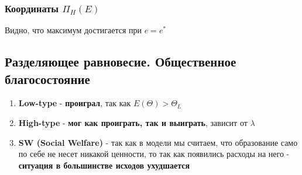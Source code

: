 \subsubsection{Координаты $\Pi_H(E)$}
\begin{center}
    \end{center}
\smallskip\indent\setlength{\parindent}{1em}Видно, что максимум достигается при $e=e^*$
\newpage
\subsection{Разделяющее равновесие. Общественное благосостояние}
\begin{enumerate}
    \item \textbf{Low-type} - \textbf{проиграл}, так как $E(\Theta)>\Theta_L$
    \item \textbf{High-type} - \textbf{мог как проиграть, так и выиграть}, зависит от $\lambda$
    \item \textbf{SW (Social Welfare)} - так как в модели мы считаем, что образование само по себе не несет никакой ценности, то так как появились расходы на него - \textbf{ситуация в большинстве исходов ухудшается}
\end{enumerate}


